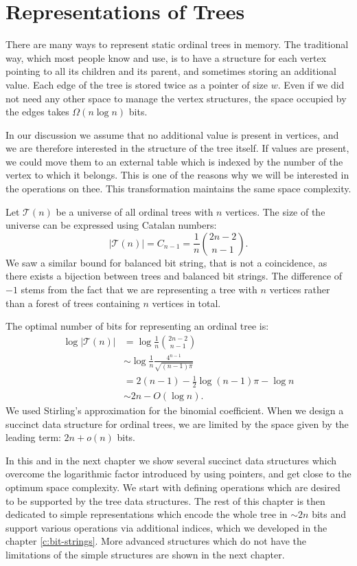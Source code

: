 \chapter{Representations of Trees}

There are many ways to represent static ordinal trees in memory.
The traditional way, which most people know and use, is to have a structure for each vertex pointing to all its children and its parent, and sometimes storing an additional value.
Each edge of the tree is stored twice as a pointer of size $w$.
Even if we did not need any other space to manage the vertex structures, the space occupied by the edges takes $\Omega (n \log n)$ bits.

In our discussion we assume that no additional value is present in vertices, and we are therefore interested in the structure of the tree itself.
If values are present, we could move them to an external table which is indexed by the number of the vertex to which it belongs.
This is one of the reasons why we will be interested in the \anyRank{} operations on thee.
This transformation maintains the same space complexity.

Let $\mathcal{T}(n)$ be a universe of all ordinal trees with $n$ vertices.
The size of the universe can be expressed using Catalan numbers:
$$ | \mathcal{T}(n) | = C_{n-1} = \frac{1}{n} {2n - 2 \choose n - 1}. $$
We saw a similar bound for balanced bit string, that is not a coincidence, as there exists a bijection between trees and balanced bit strings.
The difference of $-1$ stems from the fact that we are representing a tree with $n$ vertices rather than a forest of trees containing $n$ vertices in total.

The optimal number of bits for representing an ordinal tree is:
\begin{align*}
	\log | \mathcal{T}(n) | &= \log \frac{1}{n} {2n - 2 \choose n - 1} \\
	&\sim \log \frac{1}{n}\frac{4^{n-1}}{\sqrt{(n-1)\pi}} \\
	&= 2(n - 1) - \frac{1}{2} \log{(n - 1)\pi} - \log n \\
	&\sim 2n - O(\log n).
\end{align*}
We used Stirling's approximation for the binomial coefficient.
When we design a succinct data structure for ordinal trees, we are limited by the space given by the leading term: $2n + o(n)$ bits.

In this and in the next chapter we show several succinct data structures which overcome the logarithmic factor introduced by using pointers, and get close to the optimum space complexity.
We start with defining operations which are desired to be supported by the tree data structures.
The rest of this chapter is then dedicated to simple representations which encode the whole tree in $\sim 2n$ bits and support various operations via additional indices, which we developed in the chapter \ref{c:bit-strings}.
More advanced structures which do not have the limitations of the simple structures are shown in the next chapter.

